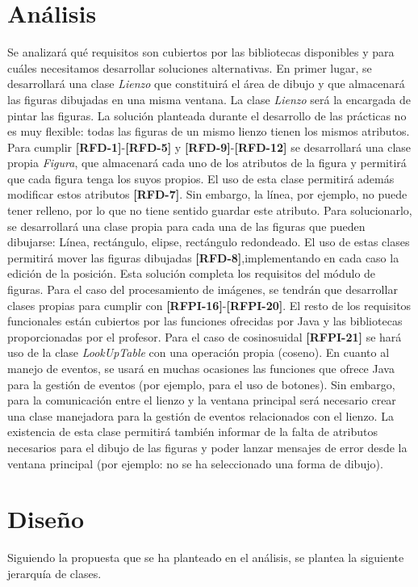 \section{Análisis}

Se analizará qué requisitos son cubiertos por las bibliotecas disponibles y para cuáles necesitamos desarrollar soluciones alternativas.
\vskip0.3cm
En primer lugar, se desarrollará una clase \textit{Lienzo} que constituirá el área de dibujo y que almacenará las figuras dibujadas en una misma ventana. La clase \textit{Lienzo} será la encargada de pintar las figuras.
\vskip0.3cm
La solución planteada durante el desarrollo de las prácticas no es muy flexible: todas las figuras de un mismo lienzo tienen los mismos atributos. Para cumplir \textbf{[RFD-1]}-\textbf{[RFD-5]} y \textbf{[RFD-9]}-\textbf{[RFD-12]} se desarrollará una clase propia \textit{Figura}, que almacenará cada uno de los atributos de la figura y permitirá que cada figura tenga los suyos propios. El uso de esta clase permitirá además modificar estos atributos \textbf{[RFD-7]}. Sin embargo, la línea, por ejemplo, no puede tener relleno, por lo que no tiene sentido guardar este atributo.
\vskip0.3cm
Para solucionarlo, se desarrollará una clase propia para cada una de las figuras que pueden dibujarse: Línea, rectángulo, elipse, rectángulo redondeado. El uso de estas clases permitirá mover las figuras dibujadas \textbf{[RFD-8]},implementando en cada caso la edición de la posición.
\vskip0.3cm
Esta solución completa los requisitos del módulo de figuras. Para el caso del procesamiento de imágenes, se tendrán que desarrollar clases propias para cumplir con \textbf{[RFPI-16]}-\textbf{[RFPI-20]}. El resto de los requisitos funcionales están cubiertos por las funciones ofrecidas por Java y las bibliotecas proporcionadas por el profesor. Para el caso de cosinosuidal \textbf{[RFPI-21]} se hará uso de la clase \textit{LookUpTable} con una operación propia (coseno).
\vskip0.3cm
En cuanto al manejo de eventos, se usará en muchas ocasiones las funciones que ofrece Java para la gestión de eventos (por ejemplo, para el uso de botones). Sin embargo, para la comunicación entre el lienzo y la ventana principal será necesario crear una clase manejadora para la gestión de eventos relacionados con el lienzo. La existencia de esta clase permitirá también informar de la falta de atributos necesarios para el dibujo de las figuras y poder lanzar mensajes de error desde la ventana principal (por ejemplo: no se ha seleccionado una forma de dibujo). 
\section{Diseño}
Siguiendo la propuesta que se ha planteado en el análisis, se plantea la siguiente jerarquía de clases.
